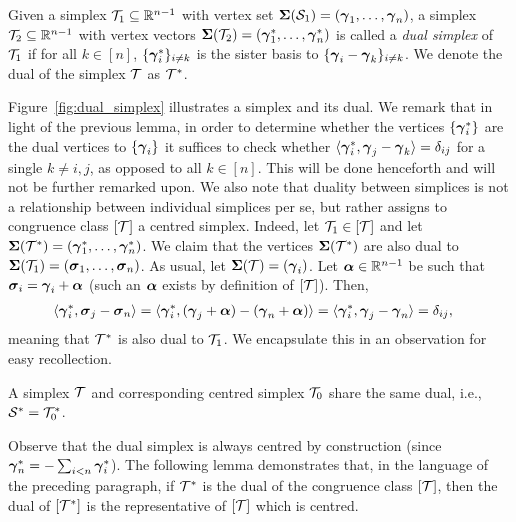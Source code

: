 \begin{definition}
\label{def:dual_simplex}
Given a simplex $\mathcal{T}_1\subseteq\mathbb{R}^{n-1}$ with vertex set $\boldsymbol{\Sigma}(\mathcal{S}_1)=(\vb*{\gamma}_1,\dots,\vb*{\gamma}_n)$, a simplex $\mathcal{T}_2\subseteq \mathbb{R}^{n-1}$ with vertex vectors $\boldsymbol{\Sigma}(\mathcal{T}_2)=(\vb*{\gamma}^*_1,\dots,\vb*{\gamma}^*_n)$ is called a \emph{dual simplex} of $\mathcal{T}_1$ if for all $k\in[n]$, $\{\vb*{\gamma}^*_i\}_{i\neq k}$ is the sister basis to $\{\vb*{\gamma}_i-\vb*{\gamma}_k\}_{i\neq k}$. We denote the dual of the simplex $\mathcal{T}$ as $\mathcal{T}^*$. 
\end{definition}

Figure~\ref{fig:dual_simplex} illustrates a simplex and its dual. We remark that in light of the previous lemma, in order to determine whether the vertices $\{\vb*{\gamma}^*_i\}$ are the dual vertices to $\{\vb*{\gamma}_i\}$ it suffices to check whether $\langle \vb*{\gamma}^*_i,\vb*{\gamma}_j-\vb*{\gamma}_k\rangle=\delta_{ij}$ for a single $k\neq i,j$, as opposed to all $k\in[n]$. This will be done henceforth and will not be further remarked upon. 
We also note that duality between simplices is not a relationship between individual simplices per se, but rather assigns to congruence class $[\mathcal{T}]$ a centred simplex. Indeed, let $\mathcal{T}_1\in[\mathcal{T}]$
and  let $\boldsymbol{\Sigma}(\mathcal{T}^*)=(\vb*{\gamma}_1^*,\dots,\vb*{\gamma}_n^*)$. We claim that  the vertices $\boldsymbol{\Sigma}(\mathcal{T}^*)$ are also dual to $\boldsymbol{\Sigma}(\mathcal{T}_1)=(\vb*{\sigma}_1,\dots,\vb*{\sigma}_n)$. As  usual, let $\boldsymbol{\Sigma}(\mathcal{T})=(\vb*{\gamma}_i)$. Let  $\vb*{\alpha}\in\mathbb{R}^{n-1}$  be such that $\vb*{\sigma}_i = \vb*{\gamma}_i + \vb*{\alpha}$ (such an $\vb*{\alpha}$ exists by definition of $[\mathcal{T}]$). Then, 
\begin{align*}
\langle \vb*{\gamma}_i^*,\vb*{\sigma}_j-\vb*{\sigma}_n\rangle &= \langle \vb*{\gamma}_i^*,(\vb*{\gamma}_j+\vb*{\alpha}) - (\vb*{\gamma}_n+\vb*{\alpha})\rangle = \langle \vb*{\gamma}_i^*,\vb*{\gamma}_j-\vb*{\gamma}_n\rangle=\delta_{ij},
\end{align*}
meaning that $\mathcal{T}^*$ is also dual to $\mathcal{T}_1$. We encapsulate this in an observation for easy recollection. 

\begin{observation}
	\label{obs:dual_centred}
	A simplex $\mathcal{T}$ and corresponding centred simplex $\mathcal{T}_0$ share the same dual, i.e., $\mathcal{S}^* = \mathcal{T}_0^*$. 
\end{observation}


Observe that the dual simplex is always centred by construction (since $\vb*{\gamma}^*_n=-\sum_{i<n}\vb*{\gamma}^*_i$).  The following lemma demonstrates that, in the language of the preceding paragraph, if $\mathcal{T}^*$ is the dual of the congruence class $[\mathcal{T}]$, then the dual of $[\mathcal{T}^*]$ is the representative of $[\mathcal{T}]$ which is centred. 

